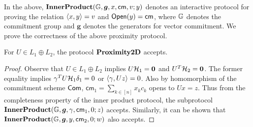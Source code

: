 In the above,
$\mathbf{InnerProduct}(\mathbb{G},\bm{g},x,\mathsf{cm},v;y)$ denotes an interactive
protocol for proving the relation $\langle x,y\rangle=v$ and $\mathsf{Open}(y)=\mathsf{cm}$,
where $\mathbb{G}$ denotes the commitment group and $\bm{g}$ denotes the generators for
vector commitment. We prove the correctness of the above proximity protocol.

\begin{lemma}[Completeness]\label{lem:proximity2d_complete}
For $U\in L_1\oplus L_2$, the protocol $\mathbf{Proximity2D}$ accepts.
\end{lemma}
\begin{proof}
Observe that $U\in L_1\oplus L_2$ implies $U\mathcal{H}_1=\bm{0}$ and
$U^T\mathcal{H}_2=\bm{0}$. The former equality implies $\gamma^TU\mathcal{H}_1\delta_1=0$
or $\langle \gamma,Uz\rangle=0$. Also by homomorphism of the commitment scheme $\mathsf{Com}$,
$\mathsf{cm}_1=\sum_{k\in [n]}x_kc_k$ opens to $Ux=z$. Thus from the
completeness property of the inner product protocol, the subprotocol
$\mathbf{InnerProduct}(\mathbb{G},\bm{g},\gamma,\mathsf{cm}_1,0;z)$ accepts. Similarly,
it can be shown that $\mathbf{InnerProduct}(\mathbb{G},\bm{g},y,\mathsf{cm}_2,0;w)$
also accepts.
\end{proof}
 
